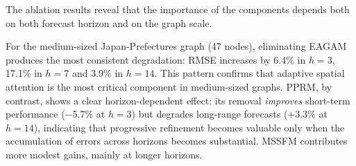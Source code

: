 \documentclass[final,1p,times]{elsarticle}
\begin{document}
\begin{table}[htbp]
    \centering
    \caption{Ablation study on NHS-ICUBeds (7 nodes, daily).}
    \label{tab:ablation_nhs}
\end{table}

The ablation results reveal that the importance of the components depends both on both forecast horizon and on the graph scale.

For the medium-sized Japan-Prefectures graph (47 nodes), eliminating EAGAM produces the most consistent degradation: RMSE increases by 6.4\% in $h{=}3$, 17.1\% in $h{=}7$ and 3.9\% in $h{=}14$. This pattern confirms that adaptive spatial attention is the most critical component in medium-sized graphs. PPRM, by contrast, shows a clear horizon-dependent effect: its removal \emph{improves} short-term performance ($-$5.7\% at $h{=}3$) but degrades long-range forecasts (+3.3\% at $h{=}14$), indicating that progressive refinement becomes valuable only when the accumulation of errors across horizons becomes substantial. MSSFM contributes more modest gains, mainly at longer horizons.
\end{document}
